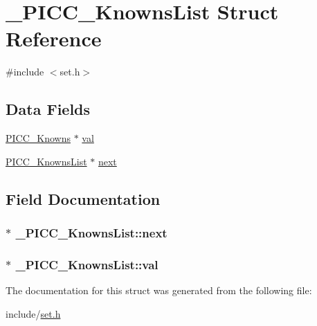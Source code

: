 \hypertarget{struct__PICC__KnownsList}{\section{\-\_\-\-P\-I\-C\-C\-\_\-\-Knowns\-List Struct Reference}
\label{struct__PICC__KnownsList}
}


{\ttfamily \#include $<$set.\-h$>$}

\subsection*{Data Fields}
\begin{DoxyCompactItemize}
\item 
\hyperlink{channel_8h_a87609417467916d98a7505871adc1760}{P\-I\-C\-C\-\_\-\-Knowns} $\ast$ \hyperlink{struct__PICC__KnownsList_a66b9f1e034dd5f1863956d46efa8097d}{val}
\item 
\hyperlink{set_8h_a3af1ac6fc4255970b8d67d50fe443680}{P\-I\-C\-C\-\_\-\-Knowns\-List} $\ast$ \hyperlink{struct__PICC__KnownsList_a48602073539082e56777e8dfa236fe49}{next}
\end{DoxyCompactItemize}


\subsection{Field Documentation}
\hypertarget{struct__PICC__KnownsList_a48602073539082e56777e8dfa236fe49}{
\subsubsection[{next}]{$\ast$ \-\_\-\-P\-I\-C\-C\-\_\-\-Knowns\-List\-::next}}\label{struct__PICC__KnownsList_a48602073539082e56777e8dfa236fe49}
\hypertarget{struct__PICC__KnownsList_a66b9f1e034dd5f1863956d46efa8097d}{
\subsubsection[{val}]{$\ast$ \-\_\-\-P\-I\-C\-C\-\_\-\-Knowns\-List\-::val}}\label{struct__PICC__KnownsList_a66b9f1e034dd5f1863956d46efa8097d}


The documentation for this struct was generated from the following file\-:\begin{DoxyCompactItemize}
\item 
include/\hyperlink{set_8h}{set.\-h}\end{DoxyCompactItemize}
